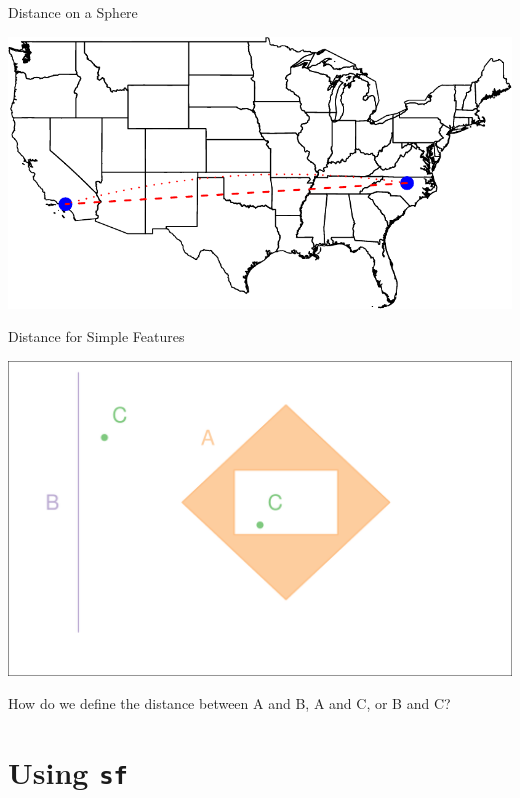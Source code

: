 \documentclass[11pt,ignorenonframetext,]{beamer}
\begin{document}
\begin{frame}{Distance on a Sphere}

\includegraphics{Lec16_files/figure-beamer/unnamed-chunk-8-1.pdf}

\end{frame}

\begin{frame}{Distance for Simple Features}

\begin{center}\includegraphics{Lec16_files/figure-beamer/unnamed-chunk-9-1} \end{center}

How do we define the distance between A and B, A and C, or B and C?

\end{frame}

\section{\texorpdfstring{Using \texttt{sf}}{Using sf}}\label{using-sf}
\end{document}
